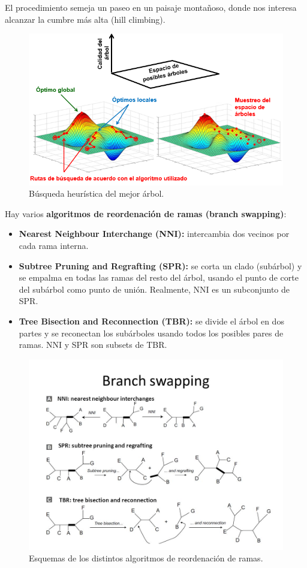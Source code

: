 El procedimiento semeja un paseo en un paisaje montañoso, donde nos interesa alcanzar la cumbre más alta (hill climbing).

\begin{figure}[htbp]
\centering
\includegraphics[width=0.7\linewidth]{figs/busqueda-heuristica.png}
\caption{Búsqueda heurística del mejor árbol.}
\end{figure}

Hay varios \textbf{algoritmos de reordenación de ramas (branch swapping)}: \begin{itemize}
\item \textbf{Nearest Neighbour Interchange (NNI):} intercambia dos vecinos por cada rama interna.
\item \textbf{Subtree Pruning and Regrafting (SPR):} se corta un clado (subárbol) y se empalma en todas las ramas del resto del árbol, usando el punto de corte del subárbol como punto de unión. Realmente, NNI es un subconjunto de SPR. 
\item \textbf{Tree Bisection and Reconnection (TBR):} se divide el árbol en dos partes y se reconectan los subárboles usando todos los posibles pares de ramas. NNI y SPR son subsets de TBR.
\end{itemize}

\begin{figure}[htbp]
\centering
\includegraphics[width=0.7\linewidth]{figs/branch-swapping.jpg}
\caption{Esquemas de los distintos algoritmos de reordenación de ramas.}
\end{figure}

